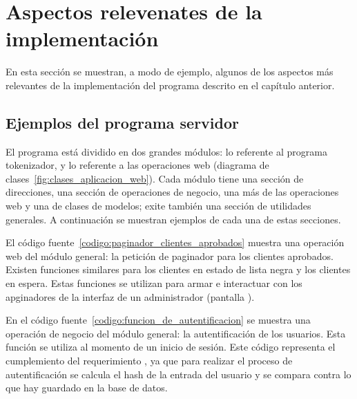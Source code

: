 %
%

\section{Aspectos relevenates de la implementación}

En esta sección se muestran, a modo de ejemplo, algunos de los aspectos más
relevantes de la implementación del programa descrito en el capítulo anterior.

\subsection{Ejemplos del programa servidor}

El programa está dividido en dos grandes módulos: lo referente al programa
tokenizador, y lo referente a las operaciones web (diagrama de
clases~\ref{fig:clases_aplicacion_web}). Cada módulo tiene una sección de
direcciones, una sección de operaciones de negocio, una más de las operaciones
web y una de clases de modelos; exite también una sección de utilidades
generales. A continuación se muestran ejemplos de cada una de estas secciones.

El código fuente~\ref{codigo:paginador_clientes_aprobados} muestra una
operación web del módulo general: la petición de paginador para los clientes
aprobados. Existen funciones similares para los clientes en estado de lista
negra y los clientes en espera. Estas funciones se utilizan para armar e
interactuar con los apginadores de la interfaz de un administrador (pantalla
).


En el código fuente~\ref{codigo:funcion_de_autentificacion} se muestra una
operación de negocio del módulo general: la autentificación de los usuarios.
Esta función se utiliza al momento de un inicio de sesión. Este código
representa el cumplemiento del requerimiento
, ya que para realizar el
proceso de autentificación se calcula el hash de la entrada del usuario y se
compara contra lo que hay guardado en la base de datos.


